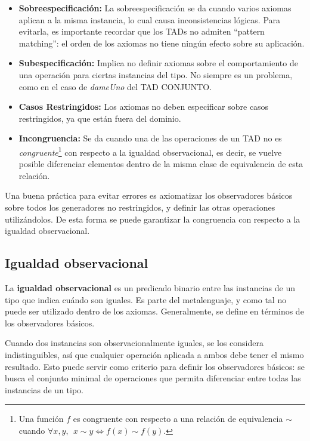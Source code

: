 \documentclass{article}
\begin{document}
\begin{itemize}
    \item \textbf{Sobreespecificación:} La sobreespecificación se da cuando varios axiomas aplican a la misma instancia, lo cual causa inconsistencias lógicas. Para evitarla, es importante recordar que los TADs no admiten ``pattern matching'': el orden de los axiomas no tiene ningún efecto sobre su aplicación.
    \item \textbf{Subespecificación:} Implica no definir axiomas sobre el comportamiento de una operación para ciertas instancias del tipo. No siempre es un problema, como en el caso de \textit{dameUno} del TAD \textsc{CONJUNTO}.
    \item \textbf{Casos Restringidos:} Los axiomas no deben especificar sobre casos restringidos, ya que están fuera del dominio.
    \item \textbf{Incongruencia:} Se da cuando una de las operaciones de un TAD no es \textit{congruente}\footnote{Una función $f$ es congruente con respecto a una relación de equivalencia $\sim$ cuando $\forall x, y,\ \ x \sim y \Longleftrightarrow f(x) \sim f(y) $.} con respecto a la igualdad observacional, es decir, se vuelve posible diferenciar elementos dentro de la misma clase de equivalencia de esta relación.
\end{itemize}

Una buena práctica para evitar errores es axiomatizar los observadores básicos sobre todos los generadores no restringidos, y definir las otras operaciones utilizándolos. De esta forma se puede garantizar la congruencia con respecto a la igualdad observacional.

\subsection{Igualdad observacional}

La \textbf{igualdad observacional} es un predicado binario entre las instancias de un tipo que indica cuándo son iguales. Es parte del metalenguaje, y como tal no puede ser utilizado dentro de los axiomas. Generalmente, se define en términos de los observadores básicos.

Cuando dos instancias son observacionalmente iguales, se los considera indistinguibles, así que cualquier operación aplicada a ambos debe tener el mismo resultado. Esto puede servir como criterio para definir los observadores básicos: se busca el conjunto minimal de operaciones que permita diferenciar entre todas las instancias de un tipo.
\end{document}

